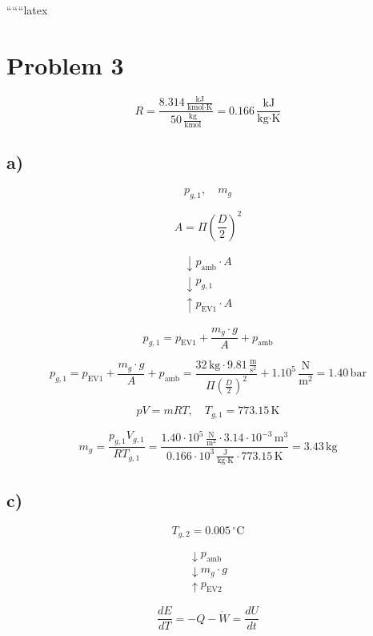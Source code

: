 
``````latex


\section*{Problem 3}

\[
R = \frac{8.314 \, \frac{\text{kJ}}{\text{kmol} \cdot \text{K}}}{50 \, \frac{\text{kg}}{\text{kmol}}} = 0.166 \, \frac{\text{kJ}}{\text{kg} \cdot \text{K}}
\]

\subsection*{a)}

\[
p_{g,1}, \quad m_g
\]

\[
A = \Pi \left( \frac{D}{2} \right)^2
\]

\[
\begin{array}{c}
\downarrow p_{\text{amb}} \cdot A \\
\downarrow p_{g,1} \\
\uparrow p_{\text{EV1}} \cdot A
\end{array}
\]

\[
p_{g,1} = p_{\text{EV1}} + \frac{m_g \cdot g}{A} + p_{\text{amb}}
\]

\[
p_{g,1} = p_{\text{EV1}} + \frac{m_g \cdot g}{A} + p_{\text{amb}} = \frac{32 \, \text{kg} \cdot 9.81 \, \frac{\text{m}}{\text{s}^2}}{\Pi \left( \frac{D}{2} \right)^2} + 1.10^5 \, \frac{\text{N}}{\text{m}^2} = \boxed{1.40 \, \text{bar}}
\]

\[
pV = mRT, \quad T_{g,1} = 773.15 \, \text{K}
\]

\[
m_g = \frac{p_{g,1} V_{g,1}}{R T_{g,1}} = \frac{1.40 \cdot 10^5 \, \frac{\text{N}}{\text{m}^2} \cdot 3.14 \cdot 10^{-3} \, \text{m}^3}{0.166 \cdot 10^3 \, \frac{\text{J}}{\text{kg} \cdot \text{K}} \cdot 773.15 \, \text{K}} = 3.43 \, \text{kg}
\]

\subsection*{c)}

\[
T_{g,2} = 0.005 \, ^\circ \text{C}
\]

\[
\begin{array}{c}
\downarrow p_{\text{amb}} \\
\downarrow m_g \cdot g \\
\uparrow p_{\text{EV2}}
\end{array}
\]

\[
\frac{dE}{dT} = -Q - \dot{W} = \frac{dU}{dt}
\]

